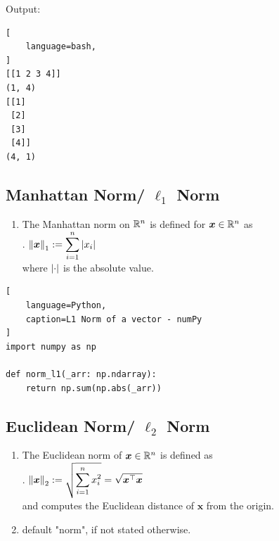 Output:
\begin{lstlisting}[
    language=bash,
]
[[1 2 3 4]]
(1, 4)
[[1]
 [2]
 [3]
 [4]]
(4, 1)
\end{lstlisting}


\subsection{Manhattan Norm/ $\ell_1$ Norm}

\begin{enumerate}
    \item The Manhattan norm on $\mathbb{R}^n$ is defined for $\bm{x} \in \mathbb{R}^n$ as
    \hfill \cite{mfml/book/mml/Deisenroth-Faisal-Ong}
    \\
    .\hfill
    $
        \left\| \bm{x} \right\|_1 := \displaystyle\sum^n_{i=1} \left| x_i \right|
    $
    \hfill \cite{mfml/book/mml/Deisenroth-Faisal-Ong}
    \\
    where $\left| \cdot \right|$ is the absolute value.
    \hfill \cite{mfml/book/mml/Deisenroth-Faisal-Ong}
\end{enumerate}


\begin{lstlisting}[
    language=Python,
    caption=L1 Norm of a vector - numPy
]
import numpy as np

def norm_l1(_arr: np.ndarray):
    return np.sum(np.abs(_arr))
\end{lstlisting}


\subsection{Euclidean Norm/ $\ell_2$ Norm}

\begin{enumerate}
    \item The Euclidean norm of $\bm{x} \in \mathbb{R}^n$ is defined as
    \hfill \cite{mfml/book/mml/Deisenroth-Faisal-Ong}
    \\
    .\hfill
    $
        \left\| \bm{x} \right\|_2 := \sqrt{ \displaystyle\sum^n_{i=1} x_i^2 } = \sqrt{\bm{x}^\top\bm{x}}
    $
    \hfill \cite{mfml/book/mml/Deisenroth-Faisal-Ong}
    \\
    and computes the Euclidean distance of $\bm{x}$ from the origin.
    \hfill \cite{mfml/book/mml/Deisenroth-Faisal-Ong}

    \item default "norm", if not stated otherwise.
    \hfill \cite{mfml/book/mml/Deisenroth-Faisal-Ong}
\end{enumerate}

